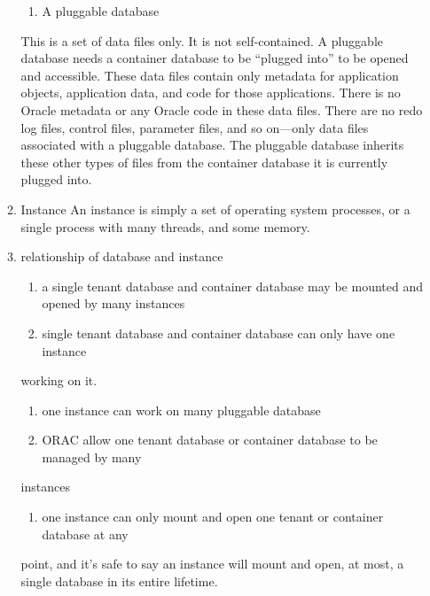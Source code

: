 \documentclass[11pt]{article}
\begin{document}
\begin{enumerate}
\begin{enumerate}
\begin{enumerate}
\item A pluggable database
\end{enumerate}
This is a set of data files only. It is not self-contained. A pluggable 
database needs a container database to be “plugged into” to be opened and 
accessible. These data files contain only metadata for application objects, 
application data, and code for those applications. There is no Oracle metadata
 or any Oracle code in these data files. There are no redo log files, control
 files, parameter files, and so on—only data files associated with a pluggable 
database. The pluggable database inherits these other types of files from the 
container database it is currently plugged into.
\item Instance
\label{sec-1-1-1-1-2}
An instance is simply a set of operating system processes, or a single process
 with many threads, and some memory.
\item relationship of database and instance
\label{sec-1-1-1-1-3}
\begin{enumerate}
\item a single tenant database and container database may be mounted and opened by
many instances
\item single tenant database and container database can only have one instance
\end{enumerate}
working on it.
\begin{enumerate}
\item one instance can work on many pluggable database
\item ORAC allow one tenant database or container database to be managed by many
\end{enumerate}
instances
\begin{enumerate}
\item one instance can only mount and open one tenant or container database at any
\end{enumerate}
point, and it's safe to say an instance will mount and open, at most, a single
database in its entire lifetime.
\end{enumerate}
\end{enumerate}
\end{document}
